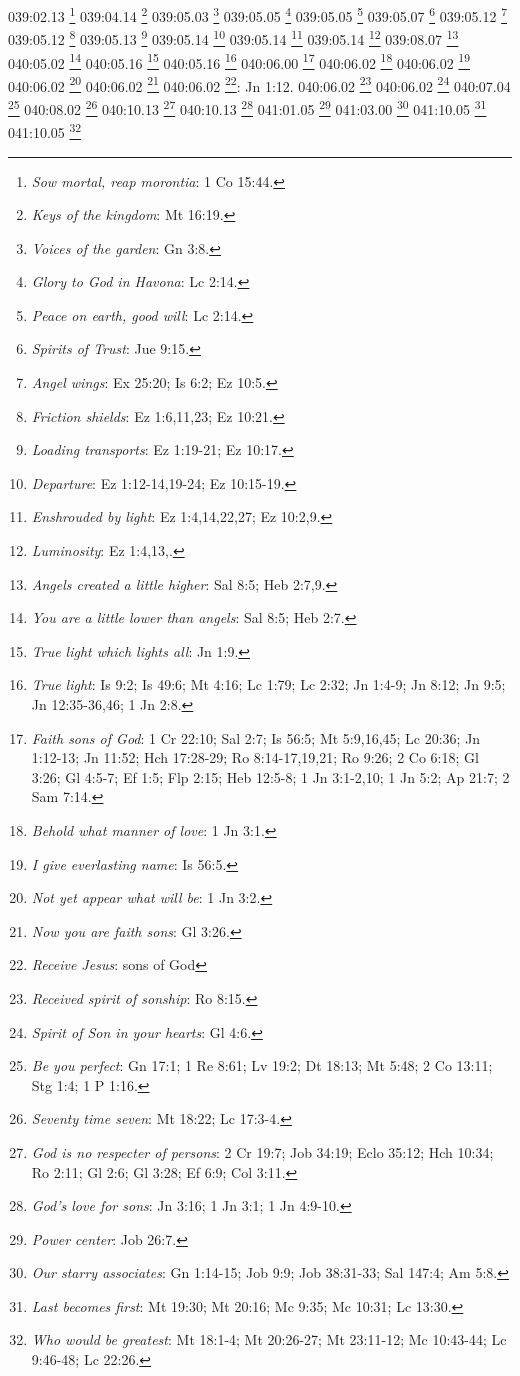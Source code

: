 {039:02.13 \footnote{\textit{Sow mortal, reap morontia}: 1 Co 15:44.}
039:04.14 \footnote{\textit{Keys of the kingdom}: Mt 16:19.}
039:05.03 \footnote{\textit{Voices of the garden}: Gn 3:8.}
039:05.05 \footnote{\textit{Glory to God in Havona}: Lc 2:14.}
039:05.05 \footnote{\textit{Peace on earth, good will}: Lc 2:14.}
039:05.07 \footnote{\textit{Spirits of Trust}: Jue 9:15.}
039:05.12 \footnote{\textit{Angel wings}: Ex 25:20; Is 6:2; Ez 10:5.}
039:05.12 \footnote{\textit{Friction shields}: Ez 1:6,11,23; Ez 10:21.}
039:05.13 \footnote{\textit{Loading transports}: Ez 1:19-21; Ez 10:17.}
039:05.14 \footnote{\textit{Departure}: Ez 1:12-14,19-24; Ez 10:15-19.}
039:05.14 \footnote{\textit{Enshrouded by light}: Ez 1:4,14,22,27; Ez 10:2,9.}
039:05.14 \footnote{\textit{Luminosity}: Ez 1:4,13,.}
039:08.07 \footnote{\textit{Angels created a little higher}: Sal 8:5; Heb 2:7,9.}
040:05.02 \footnote{\textit{You are a little lower than angels}: Sal 8:5; Heb 2:7.}
040:05.16 \footnote{\textit{True light which lights all}: Jn 1:9.}
040:05.16 \footnote{\textit{True light}: Is 9:2; Is 49:6; Mt 4:16; Lc 1:79; Lc 2:32; Jn 1:4-9; Jn 8:12; Jn 9:5; Jn 12:35-36,46; 1 Jn 2:8.}
040:06.00 \footnote{\textit{Faith sons of God}: 1 Cr 22:10; Sal 2:7; Is 56:5; Mt 5:9,16,45; Lc 20:36; Jn 1:12-13; Jn 11:52; Hch 17:28-29; Ro 8:14-17,19,21; Ro 9:26; 2 Co 6:18; Gl 3:26; Gl 4:5-7; Ef 1:5; Flp 2:15; Heb 12:5-8; 1 Jn 3:1-2,10; 1 Jn 5:2; Ap 21:7; 2 Sam 7:14.}
040:06.02 \footnote{\textit{Behold what manner of love}: 1 Jn 3:1.}
040:06.02 \footnote{\textit{I give everlasting name}: Is 56:5.}
040:06.02 \footnote{\textit{Not yet appear what will be}: 1 Jn 3:2.}
040:06.02 \footnote{\textit{Now you are faith sons}: Gl 3:26.}
040:06.02 \footnote{\textit{Receive Jesus}: sons of God}: Jn 1:12.}
040:06.02 \footnote{\textit{Received spirit of sonship}: Ro 8:15.}
040:06.02 \footnote{\textit{Spirit of Son in your hearts}: Gl 4:6.}
040:07.04 \footnote{\textit{Be you perfect}: Gn 17:1; 1 Re 8:61; Lv 19:2; Dt 18:13; Mt 5:48; 2 Co 13:11; Stg 1:4; 1 P 1:16.}
040:08.02 \footnote{\textit{Seventy time seven}: Mt 18:22; Lc 17:3-4.}
040:10.13 \footnote{\textit{God is no respecter of persons}: 2 Cr 19:7; Job 34:19; Eclo 35:12; Hch 10:34; Ro 2:11; Gl 2:6; Gl 3:28; Ef 6:9; Col 3:11.}
040:10.13 \footnote{\textit{God's love for sons}: Jn 3:16; 1 Jn 3:1; 1 Jn 4:9-10.}
041:01.05 \footnote{\textit{Power center}: Job 26:7.}
041:03.00 \footnote{\textit{Our starry associates}: Gn 1:14-15; Job 9:9; Job 38:31-33; Sal 147:4; Am 5:8.}
041:10.05 \footnote{\textit{Last becomes first}: Mt 19:30; Mt 20:16; Mc 9:35; Mc 10:31; Lc 13:30.}
041:10.05 \footnote{\textit{Who would be greatest}: Mt 18:1-4; Mt 20:26-27; Mt 23:11-12; Mc 10:43-44; Lc 9:46-48; Lc 22:26.}
